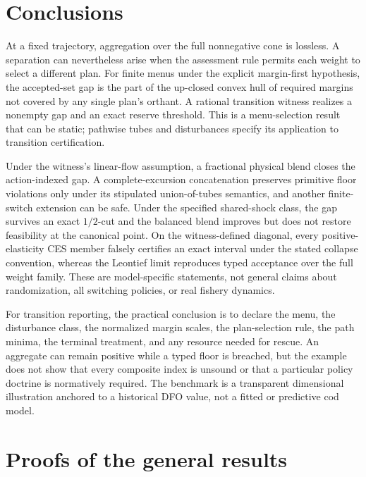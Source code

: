 \documentclass[preprint,11pt,authoryear]{elsarticle}
\theoremstyle{definition}
\theoremstyle{remark}
\begin{document}
\section{Conclusions}\label{sec:conclusions}

At a fixed trajectory, aggregation over the full nonnegative cone is lossless. A separation can nevertheless arise when the assessment rule permits each weight to select a different plan. For finite menus under the explicit margin-first hypothesis, the accepted-set gap is the part of the up-closed convex hull of required margins not covered by any single plan's orthant. A rational transition witness realizes a nonempty gap and an exact reserve threshold. This is a menu-selection result that can be static; pathwise tubes and disturbances specify its application to transition certification.

Under the witness's linear-flow assumption, a fractional physical blend closes the action-indexed gap. A complete-excursion concatenation preserves primitive floor violations only under its stipulated union-of-tubes semantics, and another finite-switch extension can be safe. Under the specified shared-shock class, the gap survives an exact $1/2$-cut and the balanced blend improves but does not restore feasibility at the canonical point. On the witness-defined diagonal, every positive-elasticity CES member falsely certifies an exact interval under the stated collapse convention, whereas the Leontief limit reproduces typed acceptance over the full weight family. These are model-specific statements, not general claims about randomization, all switching policies, or real fishery dynamics.

For transition reporting, the practical conclusion is to declare the menu, the disturbance class, the normalized margin scales, the plan-selection rule, the path minima, the terminal treatment, and any resource needed for rescue. An aggregate can remain positive while a typed floor is breached, but the example does not show that every composite index is unsound or that a particular policy doctrine is normatively required. The benchmark is a transparent dimensional illustration anchored to a historical DFO value, not a fitted or predictive cod model.

\appendix

\section{Proofs of the general results}\label{app:general}
\end{document}
